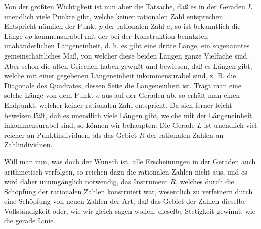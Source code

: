 \documentclass[11pt]{article}
\begin{document}
Von der größten Wichtigkeit ist nun aber die Tatsache, daß es in der Geraden $L$ unendlich viele Punkte gibt, welche keiner rationalen Zahl entsprechen. Entspricht nämlich der Punkt $p$ der rationalen Zahl $a$, so ist bekanntlich die Länge $op$ kommensurabel mit der bei der Konstruktion benutzten unabänderlichen Längeneinheit, d. h. es gibt eine dritte Länge, ein sogenanntes gemeinschaftliches Maß, von welcher diese beiden Längen ganze Vielfache sind. Aber schon die alten Griechen haben gewußt und bewiesen, daß es Längen gibt, welche mit einer gegebenen Längeneinheit inkommensurabel sind, z. B. die Diagonale des Quadrates, dessen Seite die Längeneinheit ist. Trägt man eine solche Länge von dem Punkt $o$ aus auf der Geraden ab, so erhält man einen Endpunkt, welcher keiner rationalen Zahl entspricht. Da sich ferner leicht beweisen läßt, daß es unendlich viele Längen gibt, welche mit der Längeneinheit inkommensurabel sind, so können wir behaupten: Die Gerade $L$ ist unendlich viel reicher an Punktindividuen, als das Gebiet $R$ der rationalen Zahlen an Zahlindividuen.

Will man nun, was doch der Wunsch ist, alle Erscheinungen in der Geraden auch arithmetisch verfolgen, so reichen dazu die rationalen Zahlen nicht aus, und es wird daher unumgänglich notwendig, das Instrument $R$, welches durch die Schöpfung der rationalen Zahlen konstruiert war, wesentlich zu verfeinern durch eine Schöpfung von neuen Zahlen der Art, daß das Gebiet der Zahlen dieselbe Vollständigkeit oder, wie wir gleich sagen wollen, dieselbe Stetigkeit gewinnt, wie die gerade Linie.
\end{document}
